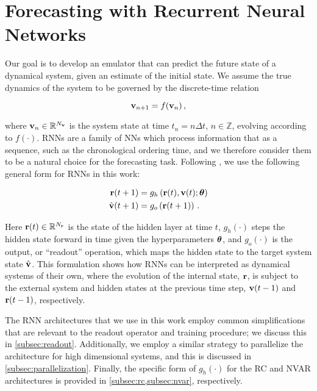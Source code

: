 \section{Forecasting with Recurrent Neural Networks}
\label{sec:methods}

Our goal is to develop an emulator that can predict the future state of a
dynamical system, given an estimate of the initial state.
We assume the true dynamics of the system to be governed by the discrete-time
relation
\begin{linenomath}\begin{equation}
    \mathbf{v}_{n+1} = f(\mathbf{v}_{n}) \, ,
\end{equation}\end{linenomath}
where $\mathbf{v}_n \in\mathbb{R}^{N_{\mathbf{v}}}$ is the system state at time $t_n = n\Delta t$,
$n\in\mathbb{Z}$, evolving according to $f(\cdot)$.
RNNs are a family of NNs which process information that as a sequence,
such as the chronological ordering time,
and we therefore consider them to be a natural choice for the forecasting
task.
Following \citet{goodfellow_sequence_2016}, we use the following general form
for RNNs in this work:
\begin{linenomath}\begin{equation}
    \begin{aligned}
        \mathbf{r}(t+1) &= g_{h}\left(
            \mathbf{r}(t), \mathbf{v}(t); \bm{\theta}
            \right) \\
        \hat{\mathbf{v}}(t+1) &= g_{o} \left( \mathbf{r}(t+1) \right) \, .
    \end{aligned}
    \label{eq:rnn}
\end{equation}\end{linenomath}
Here
$\mathbf{r}(t)\in\mathbb{R}^{N_{\mathbf{r}}}$ is the state of the hidden layer at time $t$,
$g_{h}(\cdot)$ steps the hidden state forward in time
given the hyperparameters $\bm{\theta}$,
and
$g_{o}(\cdot)$ is the output, or ``readout'' operation,
which maps the hidden state to the target system state $\hat{\mathbf{v}}$.
This formulation shows how RNNs can be interpreted as dynamical systems of their
own, where the evolution of the internal state, $\mathbf{r}$, is subject to the
external system and hidden states at the previous time step,
$\mathbf{v}(t-1)$ and $\mathbf{r}(t-1)$, respectively.

The RNN architectures that we use in this work employ common
simplifications that are relevant to the readout operator and training
procedure; we discuss this in \cref{subsec:readout}.
Additionally, we employ a similar strategy to parallelize the architecture for
high dimensional systems, and this is discussed in
\cref{subsec:parallelization}.
Finally, the specific form of $g_h(\cdot)$ for the RC and NVAR architectures
is provided in \cref{subsec:rc,subsec:nvar},
respectively.


